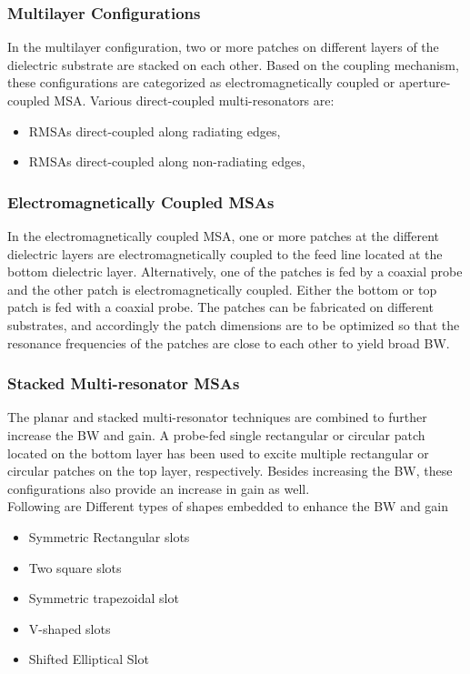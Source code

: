 \documentclass[12pt]{article}
\begin{document}
 \subsubsection{Multilayer Configurations}
  \justify
    In the multilayer configuration, two or more patches on different layers of the dielectric substrate are stacked on each other. Based on the coupling mechanism, these configurations are categorized as electromagnetically coupled or aperture-coupled MSA.
    Various direct-coupled multi-resonators are:
    \begin{itemize}
    	\item    RMSAs direct-coupled along radiating edges,
    	\item    RMSAs direct-coupled along non-radiating edges,
    \end{itemize}
  \subsubsection{Electromagnetically Coupled MSAs}
    \justify
      In the electromagnetically coupled MSA, one or more patches at the different dielectric layers are electromagnetically coupled to the feed line located at the bottom dielectric layer.
      Alternatively, one of the patches is fed by a coaxial probe and the other patch is electromagnetically coupled. Either the bottom or top patch is fed with a coaxial probe. The patches can be fabricated on different substrates, and accordingly the patch dimensions are to be optimized so that the resonance frequencies of the patches are close to each other to yield broad BW.
    \subsubsection{ Stacked Multi-resonator MSAs}
      \justify
        The planar and stacked multi-resonator techniques are combined to further increase the BW and gain. A probe-fed single rectangular or circular patch located on the bottom layer has been used to excite multiple rectangular or circular patches on the top layer, respectively. Besides increasing the BW, these configurations also provide an increase in gain as well. \\


          	Following are Different types of shapes embedded to enhance the BW and gain

        \begin{itemize}

        	\item Symmetric Rectangular slots
        	\item Two square slots
        	\item Symmetric trapezoidal slot
        	\item V-shaped slots
        	\item Shifted Elliptical Slot

        \end{itemize}
\end{document}
